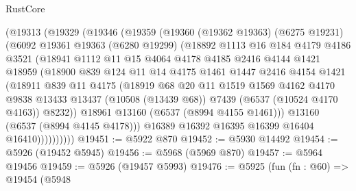 \begin{lexlean}{RustCore}
\begin{coremodule}
          (@19313
            (@19329
              (@19346
                (@19359
                  (@19360
                    (@19362 @19363)
                    (@6275 @19231)
                    (@6092
                      @19361
                      @19363
                      (@6280 @19299)
                      (@18892
                        @1113
                        @16
                        @184
                        @4179
                        @4186
                        @3521
                        (@18941
                          @1112
                          @11
                          @15
                          @4064
                          @4178
                          @4185
                          @2416
                          @4144
                          @1421
                          @18959
                          (@18900
                            @839
                            @124
                            @11
                            @14
                            @4175
                            @1461
                            @1447
                            @2416
                            @4154
                            @1421
                            (@18911
                              @839
                              @11
                              @4175
                              (@18919
                                @68
                                @20
                                @11
                                @1519
                                @1569
                                @4162
                                @4170
                                @9838
                                @13433
                                @13437
                                (@10508 (@13439 @68))
                                @7439
                                (@6537 (@10524 @4170 @4163))
                                @8232))
                            @18961
                            @13160
                            (@6537 (@8994 @4155 @1461)))
                          @13160
                          (@6537 (@8994 @4145 @4178)))
                        @16389
                        @16392
                        @16395
                        @16399
                        @16404
                        @16410))))))))))
@19451 := @5922 @870
@19452 := @5930 @14492
@19454 := @5926 (@19452 @5945)
@19456 := @5968 (@5969 @870)
@19457 := @5964 @19456
@19459 := @5926 (@19457 @5993)
@19476 := @5925
    (fun (fn : @60) =>
    @19454
      (@5948

\end{coremodule}
\end{lexlean}
